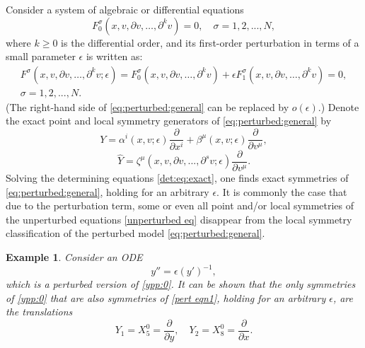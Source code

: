 \documentclass[11pt,letter,subeqn]{article}
\def\barr{\begin{array}{ll}}
\def\earr{\end{array}}
\newtheorem{example}{Example}[section]
\begin{document}
Consider a system of algebraic or differential equations
\begin{equation}\label{unperturbed eq}
  F_0^{\sigma}(x,v,\partial v,\ldots, \partial^k v)=0, \quad  \sigma=1,2,...,N,
\end{equation}
where $k\geq 0$ is the differential order, and its first-order perturbation in terms of a small parameter $\epsilon$ is written as:
\begin{equation}\label{eq:perturbed:general}
\barr
   F^{\sigma}(x,v,\partial v,\ldots, \partial^k v;\epsilon)=F_0^{\sigma}(x,v,\partial v,\ldots, \partial^k v)+\epsilon F_1^{\sigma}(x,v,\partial v,\ldots, \partial^k v)=0, \\[2ex]
   \sigma=1,2,...,N.
\earr
\end{equation}
(The right-hand side of \eqref{eq:perturbed:general} can be replaced by $o(\epsilon)$.) Denote the exact point and local symmetry generators of \eqref{eq:perturbed:general} by
\begin{equation}\label{m14}
  Y=\alpha^{i}(x,v;\epsilon)\dfrac{\partial}{\partial x^i}+ \beta^{\mu}(x,v;\epsilon)\dfrac{\partial}{\partial v^\mu},
\end{equation}
\begin{equation}\label{highgenerator}
   \hat{Y}=\zeta^\mu(x,v,\partial v,...,\partial^{s} v;\epsilon)\dfrac{\partial}{\partial v^\mu}.
\end{equation}
Solving the determining equations \eqref{det:eq:exact}, one finds exact symmetries of \eqref{eq:perturbed:general}, holding for an arbitrary $\epsilon$. It is commonly the case that due to the perturbation term, some or even all point and/or local symmetries of the unperturbed equations \eqref{unperturbed eq} disappear from the local symmetry classification of the perturbed model \eqref{eq:perturbed:general}.
\begin{example}\label{ex:exact-of-perturbed}
  Consider an ODE
\begin{equation}\label{pert eqn1}
  y''=\epsilon (y')^{-1},
\end{equation}
which is a perturbed version of \eqref{ypp:0}. It can be shown that the only symmetries of \eqref{ypp:0} that are also symmetries of \eqref{pert eqn1}, holding for an arbitrary $\epsilon$, are the translations
\begin{equation}\label{}
  Y_1=X_5^0=\dfrac{\partial}{\partial y},\quad Y_2=X_8^0= \dfrac{\partial}{\partial x}.
\end{equation}
\end{example}
\end{document}
